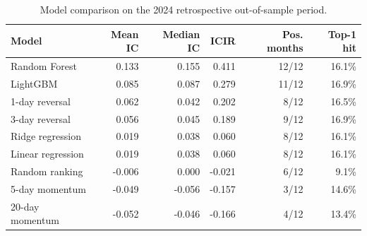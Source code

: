 \begin{table}[t]
\centering
\caption{Model comparison on the 2024 retrospective out-of-sample period.}
\label{tab:model_comparison}
\small
\begin{tabular}{@{}lrrrrr@{}}
\toprule
Model & Mean IC & Median IC & ICIR & Pos. months & Top-1 hit \\
\midrule
Random Forest & 0.133 & 0.155 & 0.411 & 12/12 & 16.1\% \\
LightGBM & 0.085 & 0.087 & 0.279 & 11/12 & 16.9\% \\
1-day reversal & 0.062 & 0.042 & 0.202 & 8/12 & 16.5\% \\
3-day reversal & 0.056 & 0.045 & 0.189 & 9/12 & 16.9\% \\
Ridge regression & 0.019 & 0.038 & 0.060 & 8/12 & 16.1\% \\
Linear regression & 0.019 & 0.038 & 0.060 & 8/12 & 16.1\% \\
Random ranking & -0.006 & 0.000 & -0.021 & 6/12 & 9.1\% \\
5-day momentum & -0.049 & -0.056 & -0.157 & 3/12 & 14.6\% \\
20-day momentum & -0.052 & -0.046 & -0.166 & 4/12 & 13.4\% \\
\bottomrule
\end{tabular}
\end{table}
